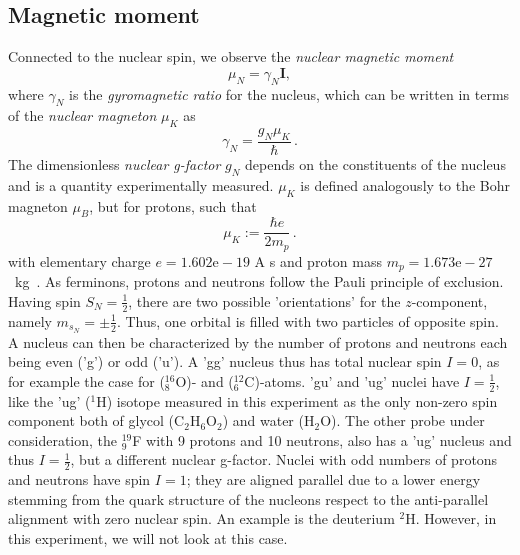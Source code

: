 \subsection{Magnetic moment}
Connected to the nuclear spin, we observe the \emph{nuclear magnetic moment}
\begin{equation}
    \mu_N = \gamma_N \mathbf{I},
\end{equation}
where $\gamma_N$ is the \emph{gyromagnetic ratio} for the nucleus, which 
can be written in terms of the \emph{nuclear magneton} $\mu_K$
as
\begin{equation}
    \gamma_N = \frac{g_N \mu_K}{\hbar} \, .
\end{equation}
The dimensionless \emph{nuclear g-factor} $g_N$ depends on the constituents of the 
nucleus and is a quantity experimentally measured. $\mu_K$ is defined 
analogously to the Bohr magneton $\mu_B$, but for protons, such that 
\begin{equation}
    \mu_K := \frac{\hbar e}{2 m_p} \, .
\end{equation}
with elementary charge $e = 1.602\mathrm{e}-19$ A s 
and proton mass $m_p = 1.673\mathrm{e}-27$~kg~\cite{Demtroeder1}.
As ferminons, protons and neutrons follow the Pauli principle of exclusion. 
Having spin $S_N = \frac{1}{2}$, there are two possible 'orientations' for 
the $z$-component, namely $m_{s_N} = \pm \frac{1}{2}$. Thus, one orbital 
is filled with two particles of opposite spin. A nucleus can then be 
characterized by the number of protons and neutrons each being 
even ('g') or odd ('u'). A 'gg' nucleus thus has total nuclear spin $I = 0$, 
as for example the case for ($_8^{16}$O)- and ($_6^{12}$C)-atoms. 
'gu' and 'ug' nuclei have $I = \frac{1}{2}$, like the 'ug' ($^1$H) isotope 
measured in this experiment as the only non-zero spin component both of 
glycol (C$_2$H$_6$O$_2$) and water (H$_2$O). The other probe under consideration, 
the $_9^{19}$F with 9 protons and 10 neutrons, 
also has a 'ug' nucleus and thus $I = \frac{1}{2}$, but a different nuclear g-factor. 
Nuclei with odd numbers of 
protons and neutrons have spin $I = 1$; they are aligned parallel due to a lower 
energy stemming from the quark structure of the nucleons respect to the anti-parallel 
alignment with zero nuclear spin. An example is the deuterium $^2$H. However, in this 
experiment, we will not look at this case. 

